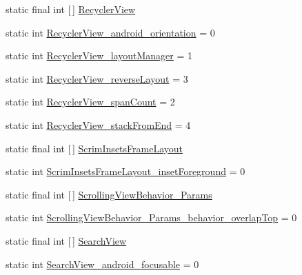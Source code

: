 \begin{DoxyCompactItemize}
static final int \mbox{[}$\,$\mbox{]} \hyperlink{classandroid_1_1support_1_1v7_1_1mediarouter_1_1R_1_1styleable_af634dfe19333cdc00d399d1f00635e93}{Recycler\+View}
\item 
static int \hyperlink{classandroid_1_1support_1_1v7_1_1mediarouter_1_1R_1_1styleable_a621eb3784913669ba2918e93cd4458f3}{Recycler\+View\+\_\+android\+\_\+orientation} = 0
\item 
static int \hyperlink{classandroid_1_1support_1_1v7_1_1mediarouter_1_1R_1_1styleable_aade41b174f9f40b820e6afdd3f51413c}{Recycler\+View\+\_\+layout\+Manager} = 1
\item 
static int \hyperlink{classandroid_1_1support_1_1v7_1_1mediarouter_1_1R_1_1styleable_a80fce516766d6c33a441eea5da180b7b}{Recycler\+View\+\_\+reverse\+Layout} = 3
\item 
static int \hyperlink{classandroid_1_1support_1_1v7_1_1mediarouter_1_1R_1_1styleable_ac4cd1f480c58b2a594180fd85c5007ae}{Recycler\+View\+\_\+span\+Count} = 2
\item 
static int \hyperlink{classandroid_1_1support_1_1v7_1_1mediarouter_1_1R_1_1styleable_a6cee8e7efa348fbf26340673590b5287}{Recycler\+View\+\_\+stack\+From\+End} = 4
\item 
static final int \mbox{[}$\,$\mbox{]} \hyperlink{classandroid_1_1support_1_1v7_1_1mediarouter_1_1R_1_1styleable_a0a27a56a35bdde444bae418bd7fdc71d}{Scrim\+Insets\+Frame\+Layout}
\item 
static int \hyperlink{classandroid_1_1support_1_1v7_1_1mediarouter_1_1R_1_1styleable_a6f1d08520fe410acc8fe81b3629cf4b2}{Scrim\+Insets\+Frame\+Layout\+\_\+inset\+Foreground} = 0
\item 
static final int \mbox{[}$\,$\mbox{]} \hyperlink{classandroid_1_1support_1_1v7_1_1mediarouter_1_1R_1_1styleable_a2b45e98021da441a2c6395c20bd5196c}{Scrolling\+View\+Behavior\+\_\+\+Params}
\item 
static int \hyperlink{classandroid_1_1support_1_1v7_1_1mediarouter_1_1R_1_1styleable_a6677a8ccfe953f468119c97a9f22aa0a}{Scrolling\+View\+Behavior\+\_\+\+Params\+\_\+behavior\+\_\+overlap\+Top} = 0
\item 
static final int \mbox{[}$\,$\mbox{]} \hyperlink{classandroid_1_1support_1_1v7_1_1mediarouter_1_1R_1_1styleable_a5573e3195bf93122a37c69394418c7d7}{Search\+View}
\item 
static int \hyperlink{classandroid_1_1support_1_1v7_1_1mediarouter_1_1R_1_1styleable_a409578cfacc43a6019fc4ba0da3b4ac7}{Search\+View\+\_\+android\+\_\+focusable} = 0
\item 

\end{DoxyCompactItemize}

